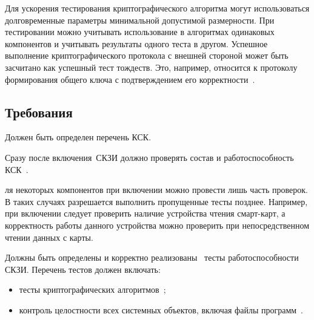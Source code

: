 Для ускорения тестирования криптографического алгоритма
могут использоваться долговременные параметры минимальной допустимой 
размерности. При тестировании можно учитывать 
использование в алгоритмах одинаковых компонентов и учитывать результаты
одного теста в другом. Успешное выполнение 
криптографического протокола с внешней стороной может быть засчитано
как успешный тест тождеств. Это, например, относится к протоколу 
формирования общего ключа с подтверждением его корректности~.


\subsection{Требования}\label{ST.Reqs}

\label{R.ST.CSCList} %
Должен быть определен перечень КСК.


\label{R.ST.CSCTests} %
Сразу после включения~СКЗИ должно проверять состав 
и работоспособность КСК~.

\begin{note*}
ля некоторых компонентов при включении можно провести лишь часть 
проверок. В таких случаях разрешается выполнить пропущенные тесты позднее. 
Например, при включении следует проверить наличие устройства чтения 
смарт-карт, а корректность работы данного устройства можно проверить при 
непосредственном чтении данных с карты. 
\end{note*}

\label{R.ST.Tests} %
Должны быть определены и корректно 
реализованы~
тесты работоспособности СКЗИ.
Перечень тестов должен включать:
\begin{itemize}
\item
тесты криптографических алгоритмов~;
\item
контроль целостности всех системных объектов, включая файлы 
программ~.
\end{itemize}

